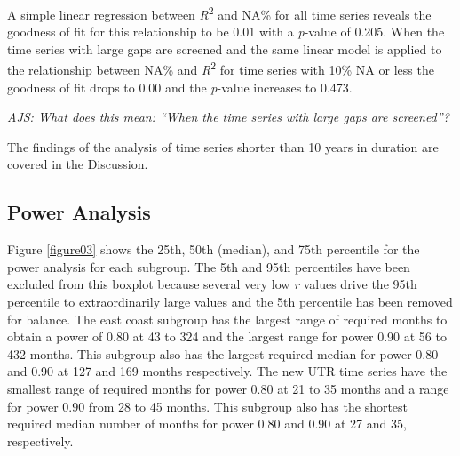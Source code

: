 \documentclass{ametsoc}
\begin{document}
A simple linear regression between \emph{R}\textsuperscript{2} and NA\% for all time series reveals the goodness of fit for this relationship to be 0.01 with a \emph{p}-value of 0.205. When the time series with large gaps are screened and the same linear model is applied to the relationship between NA\% and \emph{R}\textsuperscript{2} for time series with 10\% NA or less the goodness of fit drops to 0.00 and the \emph{p}-value increases to 0.473.

\emph{AJS: What does this mean: ``When the time series with large gaps are screened''?}

The findings of the analysis of time series shorter than 10 years in duration are covered in the Discussion.

\subsection{Power Analysis}
Figure \ref{figure03} shows the 25th, 50th (median), and 75th percentile for the power analysis for each subgroup. The 5th and 95th percentiles have been excluded from this boxplot because several very low \emph{r} values drive the 95th percentile to extraordinarily large values and the 5th percentile has been removed for balance. The east coast subgroup has the largest range of required months to obtain a power of 0.80 at 43 to 324 and the largest range for power 0.90 at 56 to 432 months. This subgroup also has the largest required median for power 0.80 and 0.90 at 127 and 169 months respectively. The new UTR time series have the smallest range of required months for power 0.80 at 21 to 35 months and a range for power 0.90 from 28 to 45 months. This subgroup also has the shortest required median number of months for power 0.80 and 0.90 at 27 and 35, respectively.
\end{document}
